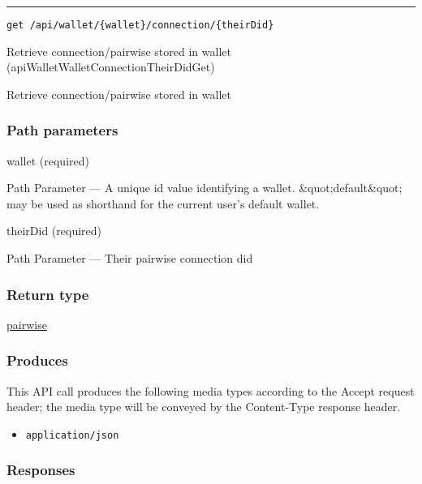 \begin{center}\rule{0.5\linewidth}{\linethickness}\end{center}

\protect\hypertarget{apiWalletWalletConnectionTheirDidGet}{}{}

\begin{verbatim}
get /api/wallet/{wallet}/connection/{theirDid}
\end{verbatim}

Retrieve connection/pairwise stored in wallet
({apiWalletWalletConnectionTheirDidGet})

Retrieve connection/pairwise stored in wallet

\hypertarget{path-parameters-101}{%
\subsubsection{Path parameters}\label{path-parameters-101}}

wallet (required)

{Path Parameter} --- A unique id value identifying a wallet.
\&quot;default\&quot; may be used as shorthand for the current user's
default wallet.

theirDid (required)

{Path Parameter} --- Their pairwise connection did

\hypertarget{return-type-142}{%
\subsubsection{Return type}\label{return-type-142}}

\protect\hyperlink{pairwise}{pairwise}

\hypertarget{produces-180}{%
\subsubsection{Produces}\label{produces-180}}

This API call produces the following media types according to the
{Accept} request header; the media type will be conveyed by the
{Content-Type} response header.

\begin{itemize}
\tightlist
\item
  \texttt{application/json}
\end{itemize}

\hypertarget{responses-186}{%
\subsubsection{Responses}\label{responses-186}}

